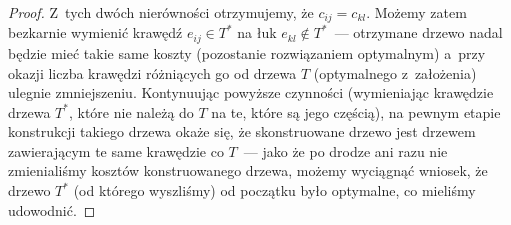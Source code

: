 \begin{proof}
	Z~tych dwóch nierówności otrzymujemy, że $c_{ij} = c_{kl}$.
	Możemy zatem bezkarnie wymienić krawędź $e_{ij} \in T^{\ast}$ na łuk $e_{kl} \notin T^{\ast}$~--- otrzymane drzewo nadal będzie mieć takie same koszty (pozostanie rozwiązaniem optymalnym) a~przy okazji liczba krawędzi różniących go od drzewa $T$ (optymalnego z~założenia) ulegnie zmniejszeniu.
	Kontynuując powyższe czynności (wymieniając krawędzie drzewa $T^{\ast}$, które nie należą do $T$ na te, które są jego częścią), na pewnym etapie konstrukcji takiego drzewa okaże się, że skonstruowane drzewo jest drzewem zawierającym te same krawędzie co $T$~--- jako że po drodze ani razu nie zmienialiśmy kosztów konstruowanego drzewa, możemy wyciągnąć wniosek, że drzewo $T^{\ast}$ (od którego wyszliśmy) od początku było optymalne, co mieliśmy udowodnić.
\end{proof}

